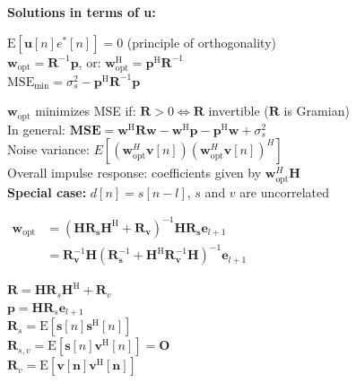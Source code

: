 \documentclass[english]{latex4ei/latex4ei_sheet}
\begin{document}
\begin{sectionbox}
  \textbf{Solutions in terms of u:}
  \begin{emphbox}
    $\mathrm{E}\left[\boldsymbol{u}[n] e^{*}[n]\right]=0$ (principle of orthogonality)\\
    $\boldsymbol{w}_{\mathrm{opt}}=\boldsymbol{R}^{-1} \boldsymbol{p}$, or: $\boldsymbol{w}_{\mathrm{opt}}^{\mathrm{H}}=\boldsymbol{p}^{\mathrm{H}} \boldsymbol{R}^{-1}$\\
    $\mathrm{MSE}_{\min }=\sigma_{s}^{2}-\boldsymbol{p}^{\mathrm{H}} \boldsymbol{R}^{-1} \boldsymbol{p}$\\
  \end{emphbox}
  $\boldsymbol{w}_{\mathrm{opt}}$ minimizes MSE if: $\boldsymbol{R}>0 \Leftrightarrow \boldsymbol{R}$ invertible ($ \boldsymbol{R}$ is Gramian)\\
  In general: $\mathbf{M S E}=\boldsymbol{w}^{\mathrm{H}} \boldsymbol{R} \boldsymbol{w}-\boldsymbol{w}^{\mathrm{H}} \boldsymbol{p}-\boldsymbol{p}^{\mathrm{H}} \boldsymbol{w}+\sigma_{s}^{2}$\\
  
  Noise variance: $E[(\boldsymbol{w}_{\mathrm{opt}}^H\boldsymbol{v}[n])(\boldsymbol{w}_{\mathrm{opt}}^H\boldsymbol{v}[n])^H]$\\
  Overall impulse response: coefficients given by $\boldsymbol{w}_{\mathrm{opt}}^H\boldsymbol{H}$\\

  \textbf{Special case: }$d[n] = s[n-l]$, $s$ and $v$ are uncorrelated
  \begin{emphbox}
    $\begin{aligned}\boldsymbol{w}_{\mathrm{opt}}&=\left(\boldsymbol{H} \boldsymbol{R}_{\boldsymbol{s}} \boldsymbol{H}^{\mathrm{H}}+\boldsymbol{R}_{\boldsymbol{v}}\right)^{-1} \boldsymbol{H} \boldsymbol{R}_{\boldsymbol{s}} \mathbf{e}_{l+1}\\&=\boldsymbol{R}_{\boldsymbol{v}}^{-1} \boldsymbol{H}\left(\boldsymbol{R}_{\boldsymbol{s}}^{-1}+\boldsymbol{H}^{\mathrm{H}} \boldsymbol{R}_{\boldsymbol{v}}^{-1} \boldsymbol{H}\right)^{-1} \mathbf{e}_{l+1}\end{aligned}$
  \end{emphbox}
  $\boldsymbol{R} = \boldsymbol{H R}_{s} \boldsymbol{H}^{\mathrm{H}} + \boldsymbol{R}_{v}$\\
  $\boldsymbol{p} = \boldsymbol{H} \boldsymbol{R}_{s} \mathbf{e}_{l+1}$\\
  $\boldsymbol{R}_s = \mathrm{E}\left[\boldsymbol{s}[n] \boldsymbol{s}^{\mathrm{H}}[n]\right]$\\
  $\boldsymbol{R}_{s,v} = \mathrm{E}\left[\boldsymbol{s}[n] \boldsymbol{v}^{\mathrm{H}}[n]\right] = \boldsymbol{O}$\\
  $\boldsymbol{R}_v = \mathrm{E}\left[\boldsymbol{v}[\boldsymbol{n}] \boldsymbol{v}^{\mathrm{H}}[\boldsymbol{n}]\right]$\\
  

\end{sectionbox}
\end{document}
